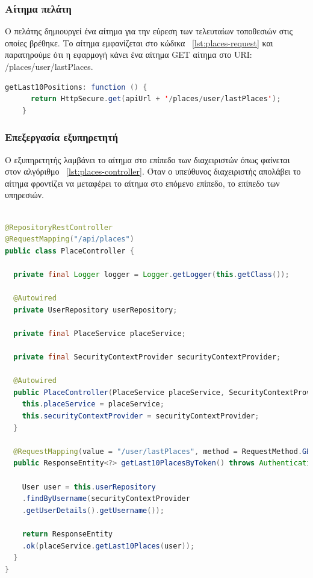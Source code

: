 \subsubsection{Αίτημα πελάτη}
Ο πελάτης δημιουργεί ένα αίτημα για την εύρεση των τελευταίων τοποθεσιών στις οποίες βρέθηκε. Το αίτημα εμφανίζεται στο κώδικα ~\ref{lst:places-request} και παρατηρούμε ότι η εφαρμογή κάνει ένα αίτημα GET αίτημα στο URI: /places/user/lastPlaces.  

\begin{lstlisting}[language=Java, caption=Αίτημα τελευταίων τοποθεσιών του χρήστη, label={lst:places-request}]
getLast10Positions: function () {
      return HttpSecure.get(apiUrl + '/places/user/lastPlaces');
    }
\end{lstlisting}

\subsubsection{Επεξεργασία εξυπηρετητή}
Ο εξυπηρετητής λαμβάνει το αίτημα στο επίπεδο των διαχειριστών όπως φαίνεται στον αλγόριθμο ~\ref{lst:places-controller}. Όταν ο υπεύθυνος διαχειριστής απολάβει το αίτημα φροντίζει να μεταφέρει το αίτημα στο επόμενο επίπεδο, το επίπεδο των υπηρεσιών.

\begin{lstlisting}[language=Java, caption=Διαχειριστής εξυπηρετητή, label={lst:places-controller}]
    
@RepositoryRestController
@RequestMapping("/api/places")
public class PlaceController {

  private final Logger logger = Logger.getLogger(this.getClass());

  @Autowired
  private UserRepository userRepository;

  private final PlaceService placeService;

  private final SecurityContextProvider securityContextProvider;

  @Autowired
  public PlaceController(PlaceService placeService, SecurityContextProvider securityContextProvider) {
    this.placeService = placeService;
    this.securityContextProvider = securityContextProvider;
  }

  @RequestMapping(value = "/user/lastPlaces", method = RequestMethod.GET)
  public ResponseEntity<?> getLast10PlacesByToken() throws AuthenticationException {
    
    User user = this.userRepository
    .findByUsername(securityContextProvider
    .getUserDetails().getUsername());
    
    return ResponseEntity
    .ok(placeService.getLast10Places(user));
  }
}

\end{lstlisting}

